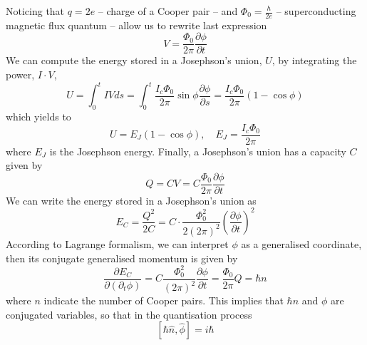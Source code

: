 Noticing that $q=2e$ -- charge of a Cooper pair -- and $\Phi_{0} = \frac{h}{2e}$ -- superconducting magnetic flux quantum --  allow us to rewrite last expression
\begin{equation}
\tag{Second Joshepshon equation}
V = \frac{\Phi_{0}}{2\pi}\frac{\partial \phi}{\partial t}
\end{equation}
We can compute the energy stored in a Josephson's union, $U$, by integrating the power, $I\cdot V$,
\begin{equation}
U = \int_{0}^{t}IVds = \int_{0}^{t}\frac{I_{c}\Phi_{0}}{2\pi}\sin{\phi}\frac{\partial \phi}{\partial s} = \frac{I_{c}\Phi_{0}}{2\pi}\left(1-\cos{\phi}\right)
\end{equation}
which yields to
\begin{equation}
\tag{Third Joshepshon equation}
U = E_{J}\left(1-\cos{\phi}\right), \quad E_{J} = \frac{I_{c}\Phi_{0}}{2\pi}
\end{equation}
where $E_{J}$ is the Josephson energy.
Finally, a Josephson's union has a capacity $C$ given by
\begin{equation}
\tag{Forth Joshepshon equation}
Q = CV = C \frac{\Phi_{0}}{2\pi}\frac{\partial \phi}{\partial t}
\end{equation}
We can write the energy stored in a Josephson's union as
\begin{equation}
E_{C} = \frac{Q^{2}}{2C} = C\cdot \frac{\Phi_{0}^{2}}{2\left(2\pi\right)^{2}}\left(\frac{\partial \phi}{\partial t}\right)^{2}
\end{equation}
According to Lagrange formalism, we can interpret $\phi$ as a generalised coordinate, then its conjugate generalised momentum is given by
\begin{equation}
\frac{\partial E_{C}}{\partial \left(\partial_{t}\phi\right)} = C \frac{\Phi_{0}^{2}}{\left(2\pi\right)^{2}}\frac{\partial \phi}{\partial t} = \frac{\Phi_{0}}{2\pi}Q = \hbar n
\end{equation}
where $n$ indicate the number of Cooper pairs. This implies that $\hbar n$ and $\phi$ are conjugated variables, so that in the quantisation process
\begin{equation}
\left[\hbar \hat{n},\hat{\phi}\right] = i\hbar
\end{equation}

